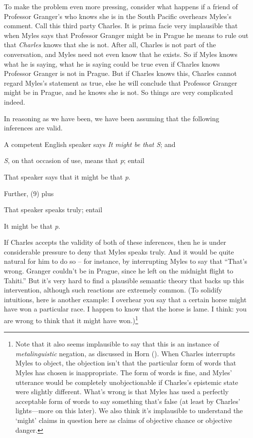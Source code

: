 \documentclass[
  10pt,
  letterpaper,
  DIV=11,
  numbers=noendperiod,
  twoside]{scrartcl}
\providecommand{\tightlist}{%
  \setlength{\itemsep}{0pt}\setlength{\parskip}{0pt}}\usepackage{longtable,booktabs,array}
\begin{document}
To make the problem even more pressing, consider what happens if a
friend of Professor Granger's who knows she is in the South Pacific
overhears Myles's comment. Call this third party Charles. It is prima
facie very implausible that when Myles says that Professor Granger might
be in Prague he means to rule out that \emph{Charles} knows that she is
not. After all, Charles is not part of the conversation, and Myles need
not even know that he exists. So if Myles knows what he is saying, what
he is saying could be true even if Charles knows Professor Granger is
not in Prague. But if Charles knows this, Charles cannot regard Myles's
statement as true, else he will conclude that Professor Granger might be
in Prague, and he knows she is not. So things are very complicated
indeed.

In reasoning as we have been, we have been assuming that the following
inferences are valid.

\begin{description}
\tightlist
\item[(7)]
A competent English speaker says \emph{It might be that S}; and
\item[(8)]
\emph{S}, on that occasion of use, means that \emph{p}; entail
\item[(9)]
That speaker says that it might be that \emph{p}.
\end{description}

Further, (9) plus

\begin{description}
\tightlist
\item[(10)]
That speaker speaks truly; entail
\item[(11)]
It might be that \emph{p}.
\end{description}

If Charles accepts the validity of both of these inferences, then he is
under considerable pressure to deny that Myles speaks truly. And it
would be quite natural for him to do so -- for instance, by interrupting
Myles to say that ``That's wrong. Granger couldn't be in Prague, since
he left on the midnight flight to Tahiti.'' But it's very hard to find a
plausible semantic theory that backs up this intervention, although such
reactions are extremely common. (To solidify intuitions, here is another
example: I overhear you say that a certain horse might have won a
particular race. I happen to know that the horse is lame. I think: you
are wrong to think that it might have won.)\footnote{Note that it also
  seems implausible to say that this is an instance of
  \emph{metalinguistic} negation, as discussed in Horn
  (). When Charles interrupts Myles to
  object, the objection isn't that the particular form of words that
  Myles has chosen is inappropriate. The form of words is fine, and
  Myles' utterance would be completely unobjectionable if Charles's
  epistemic state were slightly different. What's wrong is that Myles
  has used a perfectly acceptable form of words to say something that's
  false (at least by Charles' lights---more on this later). We also
  think it's implausible to understand the `might' claims in question
  here as claims of objective chance or objective danger.}
\end{document}

